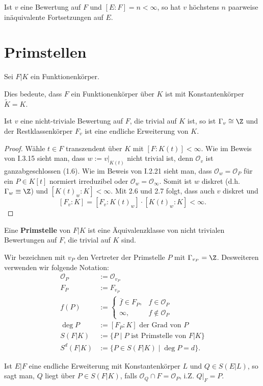 \begin{korollar}
    Ist $v$ eine Bewertung auf $F$ und $[E:F] = n < \infty$, so hat $v$ höchstens $n$ paarweise inäquivalente
    Fortsetzungen auf $E$.
\end{korollar}

\section{Primstellen}
Sei $F | K$ ein Funktionenkörper.

\begin{definition}
    Dies bedeute, dass $F$ ein Funktionenkörper über $K$ ist mit Konstantenkörper $\widetilde{K}=K$.
\end{definition}

\begin{satz}
    Ist $v$ eine nicht-triviale Bewertung auf $F$, die trivial auf $K$ ist,
    so ist $\Gamma_v \cong \Z$ und der Restklassenkörper $F_v$ ist eine endliche Erweiterung von $K$.
\end{satz}
\begin{proof}
    Wähle $t \in F$ transzendent über $K$ mit $[F:K(t)] < \infty$.
    Wie im Beweis von I.3.15 sieht man, dass $w:= v|_{K(t)}$ nicht trivial ist, denn $\mathcal{O}_v$ ist ganzabgeschlossen (1.6).
    Wie im Beweis von I.2.21 sieht man, dass $\mathcal{O}_w = \mathcal{O}_P$ für ein 
    $P \in K[t]$ normiert irreduzibel oder $\mathcal{O}_w = \mathcal{O}_{\infty}$.
    Somit ist $w$ diskret (d.h. $\Gamma_w \equiv \Z$) und $[K(t)_w:K] < \infty$.
    Mit 2.6 und 2.7 folgt, dass auch $v$ diskret und $$ [F_v:K] = [F_v:K(t)_w]\cdot [K(t)_w:K] < \infty.$$
\end{proof}

\begin{definition}
    Eine \textbf{Primstelle} von $F|K$ ist eine Äquivalenzklasse von nicht trivialen Bewertungen auf $F$, die trivial auf $K$ sind.

    Wir bezeichnen mit $v_P$ den Vertreter der Primstelle $P$ mit $\Gamma_{v_P} = \Z$. 
    Desweiteren verwenden wir folgende Notation:
    \begin{align*}
        \mathcal{O}_P &:= \mathcal{O}_{v_P}\\
        F_P &:= F_{v_P}\\
        f(P) &:= \begin{cases}
            \overline{f} \in F_P, & f \in \mathcal{O}_P\\
            \infty, & f \notin \mathcal{O}_P
        \end{cases}\\
        \deg P &:= [F_P:K] \text{ der Grad von }P\\
        S(F|K) &:= \{P \mid P \text{ ist Primstelle von } F|K\}\\
        S^d(F|K) &:= \{P \in S(F|K) \mid \deg P = d\}.
    \end{align*}

    Ist $E|F$ eine endliche Erweiterung mit Konstantenkörper $L$ und $ Q \in S(E|L)$, so sagt man, $Q$ liegt über $P \in S(F|K)$, falls
    $\mathcal{O}_Q \cap F = \mathcal{O}_P$, i.Z. $Q|_F = P$.
\end{definition}

